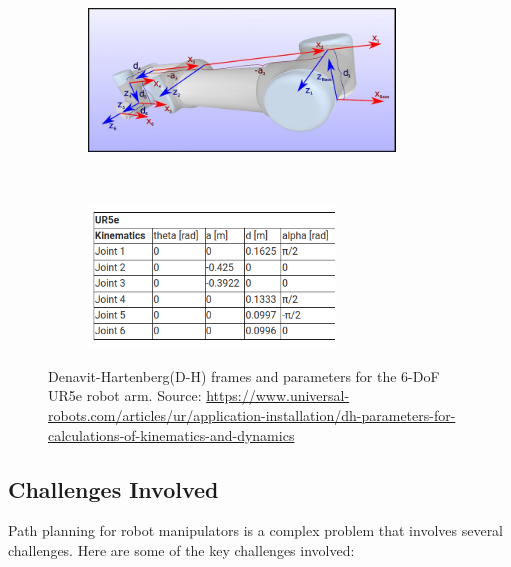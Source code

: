 \begin{figure}[t!]
    \centering
    \begin{subfigure}[t]{0.5\textwidth}
        \centering
        \includegraphics[height=1.5in]{figures/background/dh_ur5ea.jpg}
    \end{subfigure}%
    ~ 
    \begin{subfigure}[t]{0.3\textwidth}
        \centering
        \includegraphics[height=1.5in]{figures/background/dh_ur5eb.png}
    \end{subfigure}
    \caption[DH Parameters for the UR5e Arm]{Denavit-Hartenberg(D-H) frames and parameters for the 6-DoF UR5e robot arm. Source: \scriptsize{\url{https://www.universal-robots.com/articles/ur/application-installation/dh-parameters-for-calculations-of-kinematics-and-dynamics}}}
    \label{fig:dh-ur5}
\end{figure}

\subsection{Challenges Involved}

Path planning for robot manipulators is a complex problem that involves several challenges. Here are some of the key challenges involved:

